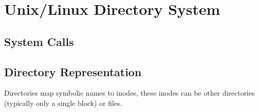 \documentclass{report}
\begin{document}
\section*{Unix/Linux Directory System}
\subsection*{System Calls}
\subsection*{Directory Representation}
Directories map symbolic names to inodes, these inodes can be other directories (typically only a single block) or files.
\end{document}
